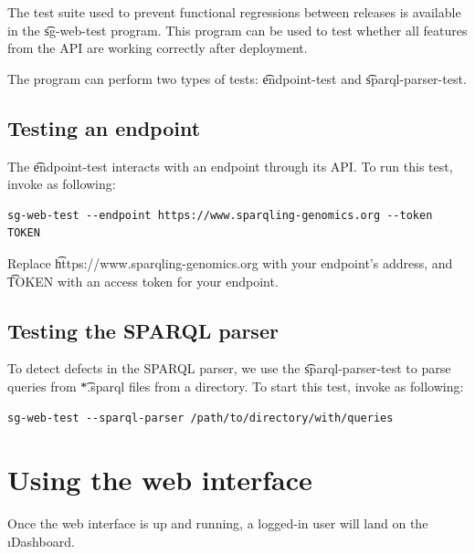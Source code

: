   The test suite used to prevent functional regressions between releases is
  available in the \t{sg-web-test} program.  This program can be used to test
  whether all features from the API are working correctly after deployment.

  The program can perform two types of tests: \t{endpoint-test} and
  \t{sparql-parser-test}.

\subsection{Testing an endpoint}

  The \t{endpoint-test} interacts with an endpoint through its API.  To run
  this test, invoke  as following:

\begin{siderules}
\begin{verbatim}
sg-web-test --endpoint https://www.sparqling-genomics.org --token TOKEN
\end{verbatim}
\end{siderules}

  Replace \t{https://www.sparqling-genomics.org} with your endpoint's
  address, and \t{TOKEN} with an access token for your endpoint.

\subsection{Testing the SPARQL parser}

  To detect defects in the SPARQL parser, we use the \t{sparql-parser-test}
  to parse queries from \t{*.sparql} files from a directory.  To start this
  test, invoke  as following:

\begin{siderules}
\begin{verbatim}
sg-web-test --sparql-parser /path/to/directory/with/queries
\end{verbatim}
\end{siderules}

\pagebreak{}
\section{Using the web interface}
\label{sec:using-web-interface}

  Once the web interface is up and running, a logged-in user will land
  on the \i{Dashboard}.

